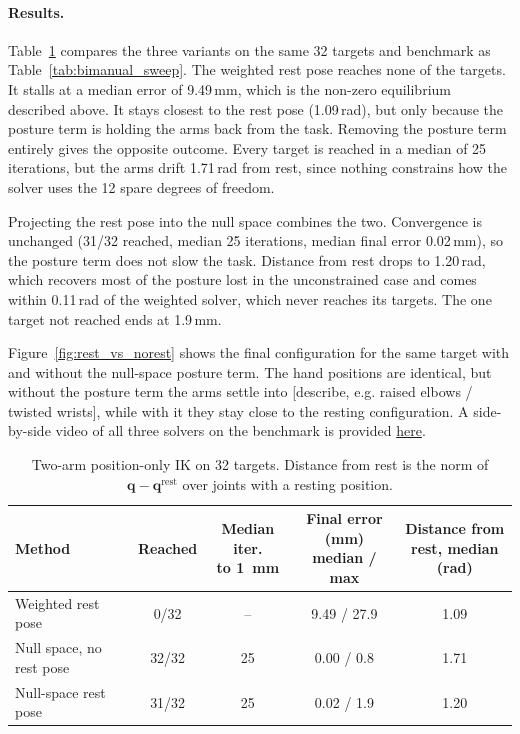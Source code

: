 \documentclass[12pt,a4paper]{article}
\begin{document}
\paragraph{Results.}
Table~\ref{tab:nullspace_results} compares the three variants on the same 32 targets and benchmark as Table~\ref{tab:bimanual_sweep}. The weighted rest pose reaches none of the targets. It stalls at a median error of 9.49\,mm, which is the non-zero equilibrium described above. It stays closest to the rest pose (1.09\,rad), but only because the posture term is holding the arms back from the task. Removing the posture term entirely gives the opposite outcome. Every target is reached in a median of 25 iterations, but the arms drift 1.71\,rad from rest, since nothing constrains how the solver uses the 12 spare degrees of freedom.

Projecting the rest pose into the null space combines the two. Convergence is unchanged (31/32 reached, median 25 iterations, median final error 0.02\,mm), so the posture term does not slow the task. Distance from rest drops to 1.20\,rad, which recovers most of the posture lost in the unconstrained case and comes within 0.11\,rad of the weighted solver, which never reaches its targets. The one target not reached ends at 1.9\,mm.

Figure~\ref{fig:rest_vs_norest} shows the final configuration for the same target with and without the null-space posture term. The hand positions are identical, but without the posture term the arms settle into [describe, e.g. raised elbows / twisted wrists], while with it they stay close to the resting configuration. A side-by-side video of all three solvers on the benchmark is provided \textcolor{blue}{\href{https://youtu.be/3rgqf_vf3_w}{here}}.

\begin{table}[htbp]
    \centering
    \small
    \setlength{\tabcolsep}{5pt}
    \begin{tabular}{l c c c c}
        \hline
        Method & Reached &
        \shortstack{Median iter.\\to 1~mm} &
        \shortstack{Final error (mm)\\median / max} &
        \shortstack{Distance from\\rest, median (rad)} \\
        \hline
        Weighted rest pose & 0/32 & -- & 9.49 / 27.9 & 1.09 \\
        Null space, no rest pose & 32/32 & 25 & 0.00 / 0.8 & 1.71 \\
        Null-space rest pose & 31/32 & 25 & 0.02 / 1.9 & 1.20 \\
        \hline
    \end{tabular}
    \caption{\small{Two-arm position-only IK on 32 targets. Distance from rest is the norm of $\mathbf{q}-\mathbf{q}^{\mathrm{rest}}$ over joints with a resting position.}}
    \label{tab:nullspace_results}
\end{table}
\end{document}
